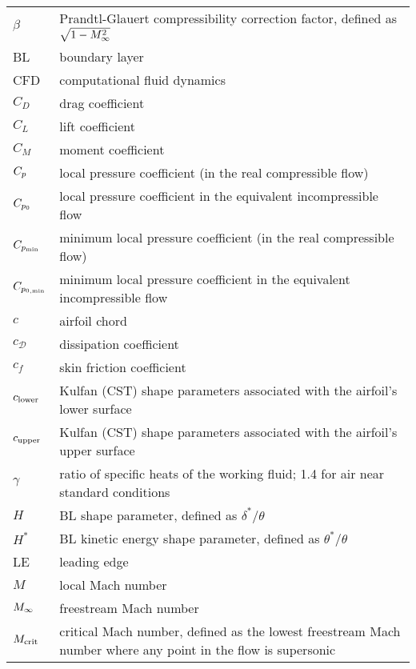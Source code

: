 \documentclass[conf]{new-aiaa}
\begin{document}
    {\renewcommand\arraystretch{1.0}
    \noindent\begin{longtable*}{@{}l @{\quad=\quad} p{5in}@{}}
                 $\beta$ & Prandtl-Glauert compressibility correction factor, defined as $\sqrt{1 - M_\infty^2}$ \\
                 BL & boundary layer \\
                 CFD & computational fluid dynamics \\
                 $C_D$ & drag coefficient \\
                 $C_L$ & lift coefficient \\
                 $C_M$ & moment coefficient \\
                 $C_p$ & local pressure coefficient (in the real compressible flow) \\
                 $C_{p_0}$ & local pressure coefficient in the equivalent incompressible flow \\
                 $C_{p_{\rm min}}$ & minimum local pressure coefficient (in the real compressible flow) \\
                 $C_{p_{0,\rm min}}$ & minimum local pressure coefficient in the equivalent incompressible flow \\
                 $c$ & airfoil chord \\
                 $c_\mathcal{D}$ & dissipation coefficient \\
                 $c_f$ & skin friction coefficient \\
                 $c_{\rm lower}$ & Kulfan (CST) shape parameters associated with the airfoil's lower surface \\
                 $c_{\rm upper}$ & Kulfan (CST) shape parameters associated with the airfoil's upper surface \\
                 $\gamma$ & ratio of specific heats of the working fluid; 1.4 for air near standard conditions \\
                 $H$ & BL shape parameter, defined as $\delta^*/\theta$ \\
                 $H^*$ & BL kinetic energy shape parameter, defined as $\theta^*/\theta$ \\
                 LE & leading edge \\
                 $M$ & local Mach number \\
                 $M_\infty$ & freestream Mach number \\
                 $M_{\rm crit}$ & critical Mach number, defined as the lowest freestream Mach number where any point in the flow is supersonic \\

\end{longtable*}}
\end{document}
